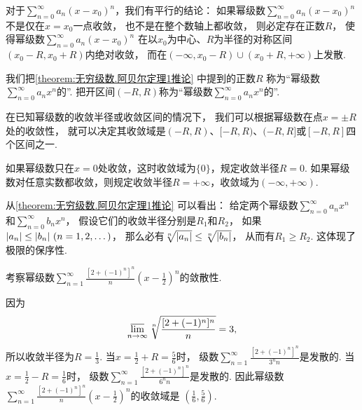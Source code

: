 对于\(\sum_{n=0}^\infty a_n (x-x_0)^n\)，我们有平行的结论：
如果幂级数\(\sum_{n=0}^\infty a_n (x-x_0)^n\)不是仅在\(x=x_0\)一点收敛，
也不是在整个数轴上都收敛，
则必定存在正数\(R\)，
使得幂级数\(\sum_{n=0}^\infty a_n (x-x_0)^n\)
在以\(x_0\)为中心、\(R\)为半径的对称区间\((x_0-R,x_0+R)\)内绝对收敛，
而在\((-\infty,x_0-R)\cup(x_0+R,+\infty)\)上发散.

我们把\cref{theorem:无穷级数.阿贝尔定理1推论} 中提到的正数\(R\)
称为“幂级数\(\sum_{n=0}^\infty a_n x^n\)的”.
把开区间\((-R,R)\)称为“幂级数\(\sum_{n=0}^\infty a_n x^n\)的”.

在已知幂级数的收敛半径或收敛区间的情况下，
我们可以根据幂级数在点\(x = \pm R\)处的收敛性，
就可以决定其收敛域是\((-R,R)\)、\([-R,R)\)、\((-R,R]\)或\([-R,R]\)四个区间之一.

如果幂级数只在\(x=0\)处收敛，这时收敛域为\(\{0\}\)，规定收敛半径\(R=0\).
如果幂级数对任意实数都收敛，则规定收敛半径\(R=+\infty\)，收敛域为\((-\infty,+\infty)\).

从\cref{theorem:无穷级数.阿贝尔定理1推论} 可以看出：
给定两个幂级数\(\sum_{n=0}^\infty a_n x^n\)和\(\sum_{n=0}^\infty b_n x^n\)，
假设它们的收敛半径分别是\(R_1\)和\(R_2\)，
如果\(\abs{a_n} \leq \abs{b_n}\ (n=1,2,\dotsc)\)，
那么必有\(\sqrt[n]{\abs{a_n}} \leq \sqrt[n]{\abs{b_n}}\)，
从而有\(R_1 \geq R_2\).
这体现了极限的保序性.

\begin{example}
考察幂级数\(\sum_{n=1}^\infty \frac{[2+(-1)^n]^n}{n} \left(x-\frac12\right)^n\)的敛散性.
\begin{solution}
因为\[
	\varlimsup_{n\to\infty} \sqrt[n]{\frac{[2+(-1)^n]^n}n} = 3,
\]
所以收敛半径为\(R=\frac13\).
当\(x=\frac12+R=\frac56\)时，
级数\(\sum_{n=1}^\infty \frac{[2+(-1)^n]^n}{3^n n}\)是发散的.
当\(x=\frac12-R=\frac16\)时，
级数\(\sum_{n=1}^\infty \frac{[2+(-1)^n]^n}{6^n n}\)是发散的.
因此幂级数\(\sum_{n=1}^\infty \frac{[2+(-1)^n]^n}{n} \left(x-\frac12\right)^n\)的收敛域是
\(\left(\frac16,\frac56\right)\).
\end{solution}
\end{example}

